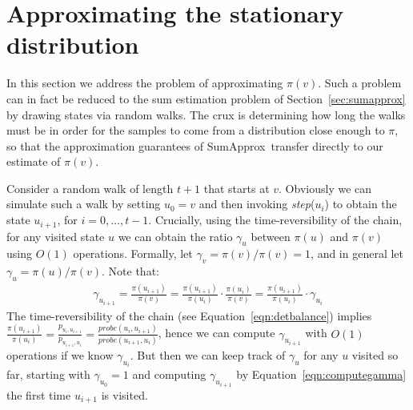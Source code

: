 \documentclass[a4paper,11pt]{article}
\newcommand{\step}{\textit{step}}
\newcommand{\probe}{\textit{probe}}
\newcommand{\sumest}{SumApprox}
\begin{document}
\section{Approximating the stationary distribution}
\label{sec:massapprox}
In this section we address the problem of approximating $\pi(v)$.
Such a problem can in fact be reduced to the sum estimation problem of Section~\ref{sec:sumapprox} by drawing states via random walks.
The crux is determining how long the walks must be in order for the samples to come from a distribution close enough to $\pi$, so that the approximation guarantees of \sumest\ transfer directly to our estimate of $\pi(v)$.

Consider a random walk of length $t+1$ that starts at $v$.
Obviously we can simulate such a walk by setting $u_0 = v$ and then invoking \step($u_i$) to obtain the state $u_{i+1}$, for $i=0,\ldots,t-1$.
Crucially, using the time-reversibility of the chain, for any visited state $u$ we can obtain the ratio $\gamma_u$ between $\pi(u)$ and $\pi(v)$ using $O(1)$ operations.
Formally, let $\gamma_v = \pi(v)/\pi(v) = 1$, and in general let $\gamma_u = \pi(u)/\pi(v)$.
Note that:
\begin{align}
\label{eqn:computegamma}
\gamma_{u_{i+1}} = \frac{\pi(u_{i+1})}{\pi(v)} = \frac{\pi(u_{i+1})}{\pi(u_{i})} \cdot \frac{\pi(u_{i})}{\pi(v)}
= \frac{\pi(u_{i+1})}{\pi(u_{i})} \cdot \gamma_{u_i}
\end{align}
The time-reversibility of the chain (see Equation~\ref{eqn:detbalance}) implies $\frac{\pi(u_{i+1})}{\pi(u_{i})} = \frac{p_{u_{i},u_{i+1}}}{p_{u_{i+1},u_{i}}} = \frac{\probe(u_{i},u_{i+1})}{\probe(u_{i+1},u_{i})}$, hence we can compute $\gamma_{u_{i+1}}$ with $O(1)$ operations if we know $\gamma_{u_i}$.
But then we can keep track of $\gamma_u$ for any $u$ visited so far, starting with $\gamma_{u_0} = 1$ and computing $\gamma_{u_{i+1}}$ by Equation~\ref{eqn:computegamma} the first time $u_{i+1}$ is visited.
\end{document}
